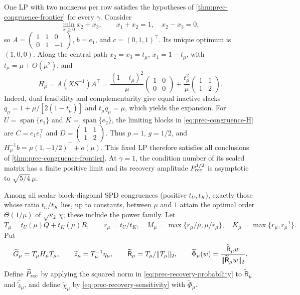 One LP with two nonzeros per row satisfies the hypotheses of
\cref{thm:prec-congruence-frontier} for every $\gamma$.  Consider
\begin{equation}
 \min_{x\geq0}x_2+x_3,\qquad
 x_1+x_2=1,\quad x_2-x_3=0,                               \label{eq:prec-small-witness}
\end{equation}
so
$A=\left(\begin{smallmatrix}1&1&0\\0&1&-1\end{smallmatrix}\right)$,
$b=e_1$, and $c=(0,1,1)^\top$.  Its unique optimum is $(1,0,0)$.  Along the
central path $x_2=x_3=t_\mu$, $x_1=1-t_\mu$, with
$t_\mu=\mu+O(\mu^2)$, and
\begin{equation}
 H_\mu=A(XS^{-1})A^\top
 =\frac{(1-t_\mu)^2}{\mu}
 \begin{pmatrix}1&0\\0&0\end{pmatrix}
 +\frac{t_\mu^2}{\mu}
 \begin{pmatrix}1&1\\1&2\end{pmatrix}.                 \label{eq:prec-witness-normal}
\end{equation}
Indeed, dual feasibility and complementarity give equal inactive slacks
$q_\mu=1+\mu/[2(1-t_\mu)]$ and $t_\mu q_\mu=\mu$, which yields the
expansion.  For $U=\operatorname{span}\{e_1\}$ and
$K=\operatorname{span}\{e_2\}$, the limiting blocks in
\eqref{eq:prec-congruence-H} are $C=e_1e_1^\top$ and
$D=\left(\begin{smallmatrix}1&1\\1&2\end{smallmatrix}\right)$.  Thus
$p=1$, $g=1/2$, and $H_\mu^{-1}b=\mu(1,-1/2)^\top+o(\mu)$.
This fixed LP therefore satisfies all conclusions of
\cref{thm:prec-congruence-frontier}.  At $\gamma=1$, the condition number of
its scaled matrix has a finite positive limit and its recovery amplitude
$P_{\rm rec}^{1/2}$ is asymptotic to $\sqrt{5/4}\,\mu$.

Among all scalar block-diagonal SPD congruences (positive $t_U,t_K$), exactly those whose ratio
$t_U/t_K$ lies, up to constants, between $\mu$ and $1$ attain the optimal
order $\Theta(1/\mu)$ of $\sqrt{\kappa_2}\,\chi$; these include the power
family.  Let
\begin{equation}
 T_\mu=t_U(\mu)Q+t_K(\mu)R,\qquad
 r_\mu=t_U/t_K,\quad
 M_\mu=\max\{r_\mu/\mu,\mu/r_\mu\},\quad
 K_\mu=\max\{r_\mu,r_\mu^{-1}\}.                         \label{eq:prec-general-scalars}
\end{equation}
Put
\begin{equation}
 \widetilde G_\mu=T_\mu H_\mu T_\mu,\qquad
 \widetilde z_\mu=T_\mu^{-1}\eta_\mu,\qquad
 \widetilde{\mathsf R}_\mu=T_\mu/\lVert T_\mu\rVert_2,\qquad
 \widetilde\Phi_\mu(w)=
 \frac{\widetilde{\mathsf R}_\mu w}
      {\lVert\widetilde{\mathsf R}_\mu w\rVert_2}.            \label{eq:prec-general-recovery}
\end{equation}
Define $\widetilde P_{\rm rec}$ by applying the squared norm in
\eqref{eq:prec-recovery-probability} to
$\widetilde{\mathsf R}_\mu$ and $\widehat{\widetilde z}_\mu$, and define
$\widetilde\chi_\mu$ by \eqref{eq:prec-recovery-sensitivity} with
$\widetilde\Phi_\mu$.


